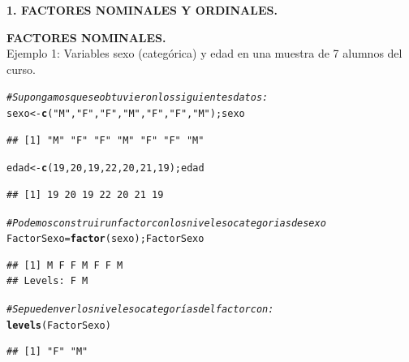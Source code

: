 \documentclass[12pt,letterpaper]{article}\usepackage[]{graphicx}\usepackage[]{color}
\makeatletter
\newcommand{\hlnum}[1]{\textcolor[rgb]{0.686,0.059,0.569}{#1}}%
\newcommand{\hlstr}[1]{\textcolor[rgb]{0.192,0.494,0.8}{#1}}%
\newcommand{\hlcom}[1]{\textcolor[rgb]{0.678,0.584,0.686}{\textit{#1}}}%
\newcommand{\hlstd}[1]{\textcolor[rgb]{0.345,0.345,0.345}{#1}}%
\newcommand{\hlkwb}[1]{\textcolor[rgb]{0.69,0.353,0.396}{#1}}%
\newcommand{\hlkwd}[1]{\textcolor[rgb]{0.737,0.353,0.396}{\textbf{#1}}}%
\newenvironment{kframe}{%
 \def\at@end@of@kframe{}%
 \ifinner\ifhmode%
  \def\at@end@of@kframe{\end{minipage}}%
  \begin{minipage}{\columnwidth}%
 \fi\fi%
 \def\FrameCommand##1{\hskip\@totalleftmargin \hskip-\fboxsep
 \colorbox{shadecolor}{##1}\hskip-\fboxsep
     \hskip-\linewidth \hskip-\@totalleftmargin \hskip\columnwidth}%
 \MakeFramed {\advance\hsize-\width
   \@totalleftmargin\z@ \linewidth\hsize
   \@setminipage}}%
 {\par\unskip\endMakeFramed%
 \at@end@of@kframe}
\newenvironment{knitrout}{}{} %
\makeatother
\begin{document}
\begin{center}
\textbf{1.  FACTORES NOMINALES Y ORDINALES.}
\end{center}

\textbf{FACTORES NOMINALES.}\\

Ejemplo 1: Variables sexo (categ\'orica) y edad en una muestra de 7 alumnos del curso. 
\begin{knitrout}
\color{fgcolor}\begin{kframe}
\begin{alltt}
\hlcom{# Supongamos que se obtuvieron los siguientes datos: }
\hlstd{sexo} \hlkwb{<-} \hlkwd{c}\hlstd{(}\hlstr{"M"}\hlstd{,} \hlstr{"F"}\hlstd{,} \hlstr{"F"}\hlstd{,} \hlstr{"M"}\hlstd{,} \hlstr{"F"}\hlstd{,} \hlstr{"F"}\hlstd{,} \hlstr{"M"}\hlstd{); sexo}
\end{alltt}
\begin{verbatim}
## [1] "M" "F" "F" "M" "F" "F" "M"
\end{verbatim}
\begin{alltt}
\hlstd{edad} \hlkwb{<-} \hlkwd{c}\hlstd{(}\hlnum{19}\hlstd{,} \hlnum{20}\hlstd{,} \hlnum{19}\hlstd{,} \hlnum{22}\hlstd{,} \hlnum{20}\hlstd{,} \hlnum{21}\hlstd{,} \hlnum{19}\hlstd{); edad}
\end{alltt}
\begin{verbatim}
## [1] 19 20 19 22 20 21 19
\end{verbatim}
\end{kframe}
\end{knitrout}
\begin{knitrout}
\color{fgcolor}\begin{kframe}
\begin{alltt}
\hlcom{# Podemos construir un factor con los niveles o categorias de sexo }
\hlstd{FactorSexo} \hlkwb{=} \hlkwd{factor}\hlstd{(sexo); FactorSexo}
\end{alltt}
\begin{verbatim}
## [1] M F F M F F M
## Levels: F M
\end{verbatim}
\end{kframe}
\end{knitrout}
\begin{knitrout}
\color{fgcolor}\begin{kframe}
\begin{alltt}
\hlcom{# Se pueden ver los niveles o categoríasdel factor con: }
\hlkwd{levels}\hlstd{(FactorSexo)}
\end{alltt}
\begin{verbatim}
## [1] "F" "M"
\end{verbatim}
\end{kframe}
\end{knitrout}
\end{document}
